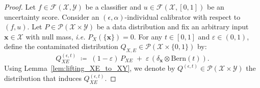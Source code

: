 \documentclass{article}
\theoremstyle{plain}
\theoremstyle{definition}
\theoremstyle{remark}
\begin{document}
\ImpossibilityCond*
\begin{proof}
Let $f \in \mathcal{F}(\mathcal{X}, \mathcal{Y})$  be a classifier and $u \in \mathcal{F}(\mathcal{X}, [0,1])$  be an uncertainty score. Consider an $(\epsilon, \alpha)$-individual calibrator with respect to $(f,u)$. Let $P \in \mathcal{P}(\mathcal{X} \times \mathcal{Y})$ be a data distribution and fix an arbitrary input $\mathbf{x}\in\mathcal X$ with null mass, \textit{i.e.} $P_X(\{\mathbf{x}\})=0$. For any $t\in[0,1]$ and $\varepsilon\in(0,1)$, define the contaminated distribution $Q_{X,E} \in \mathcal{P}(\mathcal{X} \times \{0,1\})$ by:
\[
Q_{XE}^{(\epsilon, t)} \;\coloneqq\; (1-\varepsilon)\,P_{XE}\;+\;\varepsilon\,(\delta_{\mathbf{x}}\otimes \mathrm{Bern}(t)).
\]
Using Lemma~\ref{lem:lifting_XE_to_XY}, we denote by $Q^{(\epsilon, t)} \in \mathcal{P}(\mathcal{X} \times \mathcal{Y})$ the distribution that induces $Q_{XE}^{(\epsilon, t)}$. 


\end{proof}
\end{document}
